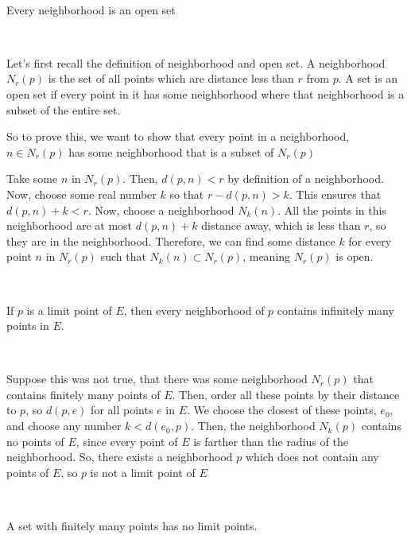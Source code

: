 \documentclass{article}
\begin{document}
\begin{theorem}
\

Every neighborhood is an open set
\end{theorem}

\begin{customproof}
\

Let's first recall the definition of neighborhood and open set. A neighborhood $N_r(p)$ is the set of all points which are distance less than $r$ from $p$. A set is an open set if every point in it has some neighborhood where that neighborhood is a subset of the entire set.

So to prove this, we want to show that every point in a neighborhood, $n \in N_r(p)$ has some neighborhood that is a subset of $N_r(p)$

Take some $n$ in $N_r(p)$. Then, $d(p,n) < r$ by definition of a neighborhood. Now, choose some real number $k$ so that $r-d(p,n) > k$. This ensures that $d(p,n) + k < r$. Now, choose a neighborhood $N_{k}(n)$. All the points in this neighborhood are at most $d(p,n) + k$ distance away, which is less than $r$, so they are in the neighborhood. Therefore, we can find some distance $k$ for every point $n$ in $N_r(p)$ such that $N_k(n) \subset N_r(p)$, meaning $N_r(p)$ is open.
\end{customproof}

\begin{theorem}
\

If $p$ is a limit point of $E$, then every neighborhood of $p$ contains infinitely many points in $E$.
\end{theorem}

\begin{customproof}
\

Suppose this was not true, that there was some neighborhood $N_r(p)$ that contains finitely many points of $E$. Then, order all these points by their distance to $p$, so $d(p,e)$ for all points $e$ in $E$. We choose the closest of these points, $e_0$, and choose any number $k < d(e_0,p)$. Then, the neighborhood $N_k(p)$ contains no points of $E$, since every point of $E$ is farther than the radius of the neighborhood. So, there exists a neighborhood $p$ which does not contain any points of $E$, so $p$ is not a limit point of $E$  
\end{customproof}

\begin{corollary}
\

A set with finitely many points has no limit points.
\end{corollary}
\end{document}
